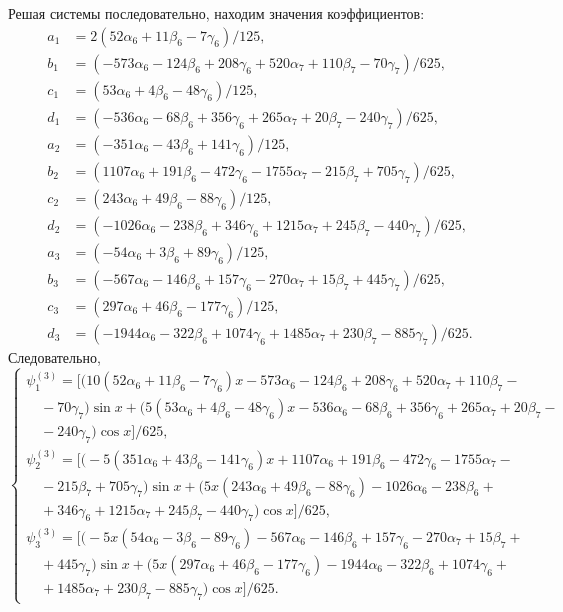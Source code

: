 \documentclass[11pt]{article}
\begin{document}
{Решая системы последовательно, находим значения коэффициентов:
\begin{align*}
a_1 &= 2(52 \alpha_6 + 11 \beta_6 - 7 \gamma_6)/125, \\
b_1 &= (-573 \alpha_6 - 124 \beta_6 + 208 \gamma_6 + 520 \alpha_7 + 110 \beta_7 - 70 \gamma_7)/625, \\
c_1 &= (53 \alpha_6 + 4 \beta_6 - 48 \gamma_6)/125, \\
d_1 &= (-536 \alpha_6 - 68 \beta_6 + 356 \gamma_6 + 265 \alpha_7 + 20 \beta_7 - 240 \gamma_7)/625, \\
a_2 &= (-351 \alpha_6 - 43 \beta_6 + 141 \gamma_6)/125, \\
b_2 &= (1107 \alpha_6 + 191 \beta_6 - 472 \gamma_6 - 1755 \alpha_7 - 215 \beta_7 + 705 \gamma_7)/625, \\
c_2 &= (243 \alpha_6 + 49 \beta_6 - 88 \gamma_6)/125, \\
d_2 &= (-1026 \alpha_6 - 238 \beta_6 + 346 \gamma_6 + 1215 \alpha_7 + 245 \beta_7 - 440 \gamma_7)/625, \\
a_3 &= (-54 \alpha_6 + 3 \beta_6 + 89 \gamma_6)/125, \\
b_3 &= (-567 \alpha_6 - 146 \beta_6 + 157 \gamma_6 - 270 \alpha_7 + 15 \beta_7 + 445 \gamma_7)/625, \\
c_3 &= (297 \alpha_6 + 46 \beta_6 - 177 \gamma_6)/125, \\
d_3 &= (-1944 \alpha_6 - 322 \beta_6 + 1074 \gamma_6 + 1485 \alpha_7 + 230 \beta_7 - 885 \gamma_7)/625.
\end{align*}
Следовательно,
\begin{equation*}
\begin{cases}
\psi_1^{(3)} = \Big[ \Big( 10(52\alpha_6 + 11\beta_6 - 7\gamma_6)x - 573\alpha_6 - 124\beta_6 + 208\gamma_6 + 520\alpha_7 + 110\beta_7 - \\
\quad - 70\gamma_7 \Big) \sin x + \Big( 5(53\alpha_6 + 4\beta_6 - 48\gamma_6)x - 536\alpha_6 - 68\beta_6 + 356\gamma_6 + 265\alpha_7 + 20\beta_7 -  \\
\quad - 240\gamma_7 \Big) \cos x \Big]/625, \\
\psi_2^{(3)} = \Big[ \Big(- 5(351\alpha_6 + 43\beta_6 - 141\gamma_6)x + 1107\alpha_6 + 191\beta_6 - 472\gamma_6 - 1755\alpha_7 - \\ 
\quad - 215\beta_7 + 705\gamma_7 \Big) \sin x + \Big(5x(243\alpha_6 + 49\beta_6 - 88\gamma_6) - 1026\alpha_6 - 238\beta_6 + \\ 
\quad + 346\gamma_6 + 1215\alpha_7 + 245\beta_7 - 440\gamma_7 \Big) \cos x \Big]/625, \\
\psi_3^{(3)} = \Big[ \Big(- 5x(54\alpha_6 - 3\beta_6 - 89\gamma_6) -567\alpha_6 - 146\beta_6 + 157\gamma_6 - 270\alpha_7 + 15\beta_7 + \\
\quad + 445\gamma_7 \Big) \sin x + \Big(5x(297\alpha_6 + 46\beta_6 - 177\gamma_6) - 1944\alpha_6 - 322\beta_6 + 1074\gamma_6 + \\ 
\quad + 1485\alpha_7 + 230\beta_7 - 885\gamma_7 \Big) \cos x \Big]/625.
\end{cases}
\end{equation*}

}
\end{document}
